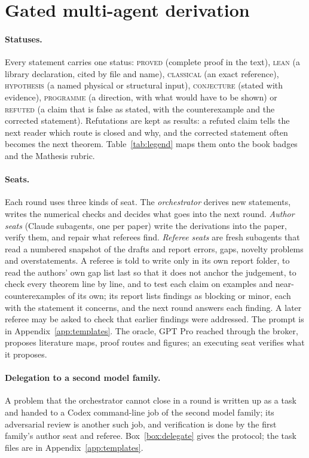 \documentclass[11pt]{article}
\begin{document}
\section{Gated multi-agent derivation}
\label{sec:reasoning}
\paragraph{Statuses.} Every statement carries one status:
\textsc{proved} (complete proof in the text), \textsc{lean} (a library
declaration, cited by file and name), \textsc{classical} (an exact reference),
\textsc{hypothesis} (a named physical or structural input),
\textsc{conjecture} (stated with evidence), \textsc{programme} (a direction,
with what would have to be shown) or \textsc{refuted} (a claim that is false
as stated, with the counterexample and the corrected statement). Refutations
are kept as results: a refuted claim tells the next reader which route is
closed and why, and the corrected statement often becomes the next
theorem. Table~\ref{tab:legend} maps them onto the book badges and the Mathesis rubric.

\paragraph{Seats.} Each round uses three kinds of seat. The
\emph{orchestrator} derives new statements, writes the numerical checks and
decides what goes into the next round. \emph{Author seats} (Claude subagents,
one per paper) write the derivations into the paper, verify them,
and repair what referees find. \emph{Referee seats} are fresh subagents that
read a numbered snapshot of the drafts and report errors, gaps, novelty
problems and overstatements. A referee is told to write only in its own
report folder, to read the authors' own gap list last so that it does not
anchor the judgement, to check every theorem line by line, and to test each
claim on examples and near-counterexamples of its own; its report lists
findings as blocking or minor, each with the statement it concerns, and the
next round answers each finding. A later referee may be asked to check that
earlier findings were addressed. The prompt is in Appendix~\ref{app:templates}. The oracle, GPT Pro reached through the
broker, proposes literature maps, proof routes and figures; an executing seat
verifies what it proposes.

\paragraph{Delegation to a second model family.} A problem that the
orchestrator cannot close in a round is written up as a task and handed to a
Codex command-line job of the second model family; its adversarial review is
another such job, and verification is done by the first family's author
seat and referee. Box~\ref{box:delegate} gives the protocol; the task files are in
Appendix~\ref{app:templates}.
\end{document}
